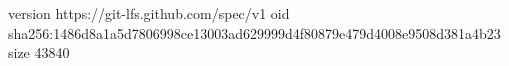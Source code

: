 version https://git-lfs.github.com/spec/v1
oid sha256:1486d8a1a5d7806998ce13003ad629999d4f80879e479d4008e9508d381a4b23
size 43840
